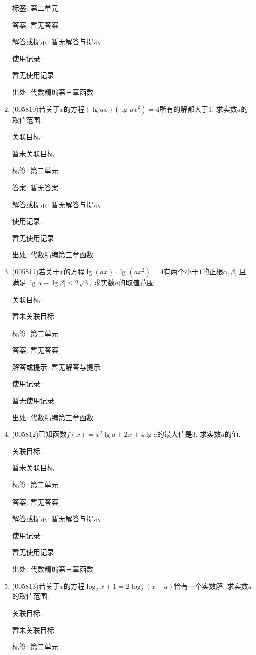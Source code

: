 \documentclass[10pt,a4paper]{article}
\begin{document}
\begin{enumerate}[1.]
标签: 第二单元

答案: 暂无答案

解答或提示: 暂无解答与提示

使用记录:

暂无使用记录


出处: 代数精编第三章函数
\item { (005810)}若关于$x$的方程$(\lg ax)(\lg ax^2)=4$所有的解都大于$1$, 求实数$a$的取值范围.


关联目标:

暂未关联目标



标签: 第二单元

答案: 暂无答案

解答或提示: 暂无解答与提示

使用记录:

暂无使用记录


出处: 代数精编第三章函数
\item { (005811)}若关于$x$的方程$\lg (ax)\cdot \lg (ax^2)=4$有两个小于$1$的正根$\alpha ,\beta$, 且满足$|\lg \alpha -\lg \beta|\le 2\sqrt 3$, 求实数$a$的取值范围.


关联目标:

暂未关联目标



标签: 第二单元

答案: 暂无答案

解答或提示: 暂无解答与提示

使用记录:

暂无使用记录


出处: 代数精编第三章函数
\item { (005812)}已知函数$f(x)=x^2\lg a+2x+4\lg a$的最大值是$3$, 求实数$a$的值.


关联目标:

暂未关联目标



标签: 第二单元

答案: 暂无答案

解答或提示: 暂无解答与提示

使用记录:

暂无使用记录


出处: 代数精编第三章函数
\item { (005813)}若关于$x$的方程$\log_2x+1=2\log_2(x-a)$恰有一个实数解, 求实数$a$的取值范围.


关联目标:

暂未关联目标



标签: 第二单元


\end{enumerate}
\end{document}
